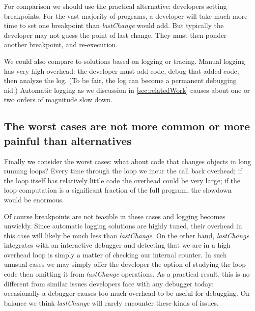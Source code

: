 \documentclass[preprint]{sigplanconf}
\begin{document}
For comparison we should use the practical alternative: developers
setting breakpoints. For the vast majority of programs, a developer
will take much more time to set one breakpoint than
\textit{lastChange} would add. But typically the developer may not
guess the point of last change. They must then ponder another
breakpoint, and re-execution. 

We could also compare to solutions based on logging or tracing. Manual
logging has very high overhead: the developer must add code, debug
that added code, then analyze the log. (To be fair, the log can become
a permanent debugging aid.) Automatic logging as we discussion in
\ref{sec:relatedWork} causes about one or two orders of magnitude slow down. 

\subsection{The worst cases are not more common or more painful than alternatives}

Finally we consider the worst cases: what about code that changes
objects in long running loops? Every time through the loop we incur
the call back overhead; if the loop itself has relatively little code
the overhead could be very large; if the loop computation is a
significant fraction of the full program, the slowdown would be
enormous. 

Of course breakpoints are not feasible in these cases and logging
becomes unwieldy. Since automatic logging solutions are highly tuned,
their overhead in this case will likely be much less than
\textit{lastChange}. On the other hand, \textit{lastChange} integrates
with an interactive debugger and detecting that we are in a high
overhead loop is simply a matter of checking our internal counter. In
such unusual cases we may simply offer the developer the option of
studying the loop code then omitting it from \textit{lastChange}
operations. As a practical result, this is no different from similar
issues developers face with any debugger today: occasionally a
debugger causes too much overhead to be useful for debugging. On
balance we think \textit{lastChange} will rarely encounter these kinds
of issues.


\end{document}
